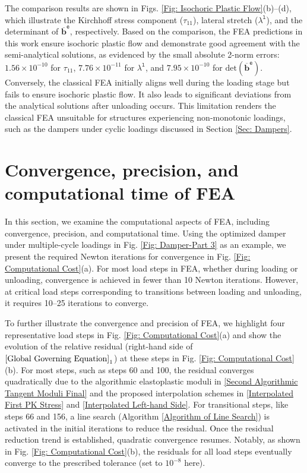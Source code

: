 \documentclass[preprint,11pt]{elsarticle}
\theoremstyle{definition}
\begin{document}
The comparison results are shown in Figs. \ref{Fig: Isochoric Plastic Flow}(b)--(d), which illustrate the Kirchhoff stress component ($\tau_{11}$), lateral stretch ($\lambda^\texttt{l}$), and the determinant of $\overline{\mathbf{b}}^\texttt{e}$, respectively. Based on the comparison, the FEA predictions in this work ensure isochoric plastic flow and demonstrate good agreement with the semi-analytical solutions, as evidenced by the small absolute 2-norm errors: $1.56 \times 10^{-10}$ for $\tau_{11}$, $7.76 \times 10^{-11}$ for $\lambda^\texttt{l}$, and $7.95 \times 10^{-10}$ for $\text{det}(\overline{\mathbf{b}}^\texttt{e})$. Conversely, the classical FEA initially aligns well during the loading stage but fails to ensure isochoric plastic flow. It also leads to significant deviations from the analytical solutions after unloading occurs. This limitation renders the classical FEA unsuitable for structures experiencing non-monotonic loadings, such as the dampers under cyclic loadings discussed in Section \ref{Sec: Dampers}.


\section{Convergence, precision, and computational time of FEA}
\label{Sec: FEA Convergence}

In this section, we examine the computational aspects of FEA, including convergence, precision, and computational time. Using the optimized damper under multiple-cycle loadings in Fig. \ref{Fig: Damper-Part 3} as an example, we present the required Newton iterations for convergence in Fig. \ref{Fig: Computational Cost}(a). For most load steps in FEA, whether during loading or unloading, convergence is achieved in fewer than 10 Newton iterations. However, at critical load steps corresponding to transitions between loading and unloading, it requires 10--25 iterations to converge.

To further illustrate the convergence and precision of FEA, we highlight four representative load steps in Fig. \ref{Fig: Computational Cost}(a) and show the evolution of the relative residual (right-hand side of $\eqref{Global Governing Equation}_1$) at these steps in Fig. \ref{Fig: Computational Cost}(b). For most steps, such as steps 60 and 100, the residual converges quadratically due to the algorithmic elastoplastic moduli in \eqref{Second Algorithmic Tangent Moduli Final} and the proposed interpolation schemes in \eqref{Interpolated First PK Stress} and \eqref{Interpolated Left-hand Side}. For transitional steps, like steps 66 and 156, a line search (Algorithm \ref{Algorithm of Line Search}) is activated in the initial iterations to reduce the residual. Once the residual reduction trend is established, quadratic convergence resumes. Notably, as shown in Fig. \ref{Fig: Computational Cost}(b), the residuals for all load steps eventually converge to the prescribed tolerance (set to $10^{-8}$ here).
\end{document}
